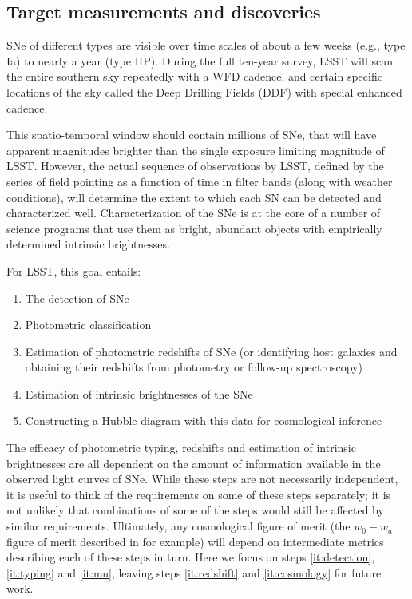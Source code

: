
\subsection{Target measurements and discoveries}
\label{sec:\secname:targets}

SNe of different types are visible over time scales of about a few
weeks (e.g., type Ia) to nearly a year (type IIP).  During the full
ten-year survey, LSST will scan the entire southern sky repeatedly with
a WFD cadence, and certain specific locations of the sky called the Deep
Drilling Fields (DDF) with special enhanced cadence.

This spatio-temporal window should contain millions
of SNe, that will have apparent magnitudes brighter than the single
exposure limiting magnitude of LSST. However, the actual sequence of
observations by LSST, defined by the series of field pointing as a
function of time in filter bands (along with weather conditions), will
determine the extent to which each SN can be detected and characterized
well.  Characterization of the SNe is at the core of a number of science
programs that use them as bright, abundant objects with empirically
determined intrinsic brightnesses. 

For LSST, this goal entails: 
\begin{enumerate}
\renewcommand{\theenumi}{\alph{enumi}}
\item The detection of SNe \label{it:detection}
\item Photometric classification \label{it:typing}
\item Estimation of photometric redshifts of SNe (or identifying host galaxies and obtaining their
redshifts from photometry or follow-up spectroscopy) \label{it:redshift}
\item Estimation of intrinsic brightnesses of the SNe \label{it:mu}
\item Constructing a Hubble diagram with this data for cosmological inference \label{it:cosmology}
\end{enumerate}

The efficacy
of photometric typing, redshifts and estimation of intrinsic brightnesses
are all dependent on the amount of information available in the observed
light curves of SNe. While these steps are not necessarily independent, it
is useful to think of the requirements on some of these steps separately;
it is not unlikely  that combinations of some of the steps would still be
affected by similar requirements. Ultimately, any cosmological figure of merit (the $w_0-w_a$ 
figure of merit described in \citet{Albrecht2006} for example) will depend on intermediate metrics 
describing each of these steps in turn. Here we focus on steps \ref{it:detection}, \ref{it:typing} 
and \ref{it:mu}, leaving steps \ref{it:redshift} and \ref{it:cosmology} for future work.

